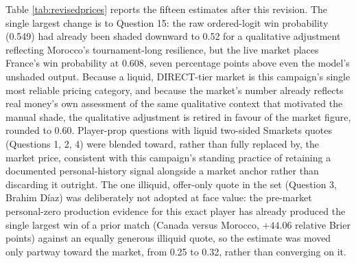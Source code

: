 \documentclass[11pt]{article}
\begin{document}
Table \ref{tab:revisedprices} reports the fifteen estimates after this revision. The
single largest change is to Question 15: the raw ordered-logit win probability (0.549)
had already been shaded downward to 0.52 for a qualitative adjustment reflecting
Morocco's tournament-long resilience, but the live market places France's win probability
at 0.608, seven percentage points above even the model's unshaded output. Because a
liquid, DIRECT-tier market is this campaign's single most reliable pricing category, and
because the market's number already reflects real money's own assessment of the same
qualitative context that motivated the manual shade, the qualitative adjustment is
retired in favour of the market figure, rounded to 0.60. Player-prop questions with
liquid two-sided Smarkets quotes (Questions 1, 2, 4) were blended toward, rather than
fully replaced by, the market price, consistent with this campaign's standing practice of
retaining a documented personal-history signal alongside a market anchor rather than
discarding it outright. The one illiquid, offer-only quote in the set (Question 3,
Brahim D\'iaz) was deliberately not adopted at face value: the pre-market personal-zero
production evidence for this exact player has already produced the single largest win of
a prior match (Canada versus Morocco, $+44.06$ relative Brier points) against an equally
generous illiquid quote, so the estimate was moved only partway toward the market,
from 0.25 to 0.32, rather than converging on it.
\end{document}
